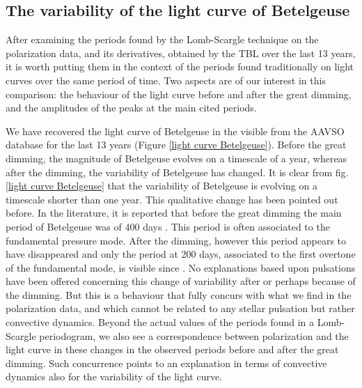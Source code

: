 \documentclass{aa}
\begin{document}
\subsection{The variability of the light curve of Betelgeuse}

After examining the periods found by the Lomb-Scargle technique on the polarization data, and its derivatives, obtained by the TBL over the last 
13 years, it is worth putting them in the context of the periods found traditionally on light curves over the same period of time. Two aspects 
are of our interest in this comparison: the behaviour of the light curve before and after the great dimming, and the amplitudes of the peaks 
at the main cited periods.


We have recovered the light curve of Betelgeuse in the visible from the AAVSO database for the last 13 years (Figure \ref{light curve Betelgeuse}).
Before the great dimming, the magnitude of Betelgeuse evolves on a timescale of a year, whereas after the dimming, the variability of Betelgeuse has changed. 
It is clear from fig. \ref{light curve Betelgeuse} that the 
variability of Betelgeuse is evolving on a timescale shorter than one year. This qualitative change has been pointed out before.
In the literature, it is reported that before the great dimming the main period of Betelgeuse was of 400 days \citep{kiss_variability_2006}. 
This period is often associated to the fundamental pressure mode. After the dimming, however this period appears to have disappeared 
and only the period at 200 days,  associated to the first overtone of the fundamental mode, is visible since \citep{dupree_great_2022}.
No explanations based upon pulsations have been offered concerning this change of variability after or perhaps because of the dimming. But this 
is a behaviour that fully concurs with what we find in the polarization data, and which cannot be related to any stellar pulsation but rather 
convective dynamics. Beyond the actual values of the periods found in a Lomb-Scargle periodogram, we also see a correspondence between polarization 
and the light curve in these changes in the observed periods before and after the great dimming. Such concurrence points to an explanation 
in terms of convective dynamics also for the variability of the light curve.
\end{document}
